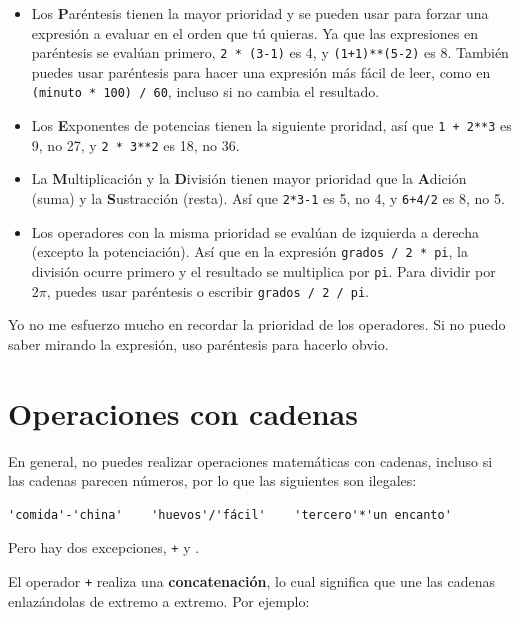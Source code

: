 \documentclass[10pt]{book}
\begin{document}
\begin{itemize}

\item Los {\bf P}aréntesis tienen la mayor prioridad y se pueden usar 
para forzar una expresión a evaluar en el orden que tú quieras. Ya que
las expresiones en paréntesis se evalúan primero, {\tt 2 * (3-1)} es 4,
y {\tt (1+1)**(5-2)} es 8. También puedes usar paréntesis para hacer una
expresión más fácil de leer, como en {\tt (minuto * 100) / 60}, incluso
si no cambia el resultado.

\item Los {\bf E}xponentes de potencias tienen la siguiente proridad, así que
{\tt 1 + 2**3} es 9, no 27, y {\tt 2 * 3**2} es 18, no 36.

\item La {\bf M}ultiplicación y la {\bf D}ivisión tienen mayor prioridad
	que la {\bf A}dición (suma) y la {\bf S}ustracción (resta).  Así que {\tt 2*3-1} es 5, no
  4, y {\tt 6+4/2} es 8, no 5.

\item Los operadores con la misma prioridad se evalúan de izquierda a
  derecha (excepto la potenciación).  Así que en la expresión {\tt grados /
    2 * pi}, la división ocurre primero y el resultado se multiplica
  por {\tt pi}.  Para dividir por $2 \pi$, puedes usar paréntesis o escribir
  {\tt grados / 2 / pi}.

\end{itemize}

Yo no me esfuerzo mucho en recordar la prioridad de los
operadores. Si no puedo saber mirando la expresión, uso
paréntesis para hacerlo obvio.


\section{Operaciones con cadenas}

En general, no puedes realizar operaciones matemáticas con cadenas, incluso
si las cadenas parecen números, por lo que las siguientes son ilegales:

\begin{verbatim}
'comida'-'china'    'huevos'/'fácil'    'tercero'*'un encanto'
\end{verbatim}
%
Pero hay dos excepciones, {\tt +} y {\tt *}.

El operador {\tt +} realiza una {\bf concatenación}, lo cual significa que
une las cadenas enlazándolas de extremo a extremo.  Por ejemplo:
\end{document}
